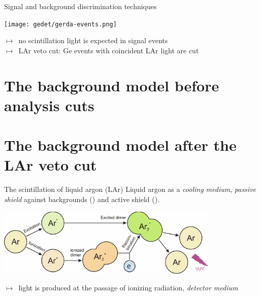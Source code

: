 \documentclass[10pt,aspectratio=169]{beamer}
\newcommand{\arrow}{$\longmapsto$}
\begin{document}
\begin{frame}{Signal and background discrimination techniques}
  \begin{center}
    \texttt{[image: gedet/gerda-events.png]}
  \end{center}
  \arrow\ no scintillation light is expected in signal events \\
  \arrow\ \alert{LAr veto cut:} Ge events with coincident LAr light are cut
\end{frame}
\section{The background model before analysis cuts}
\section{The background model after the LAr veto cut}
\begin{frame}{The scintillation of liquid argon (LAr)}
  Liquid argon as a \emph{cooling medium}, \emph{passive shield} against
  backgrounds (\phaseone) and \alert{active shield} (\phasetwo).
  \begin{center}
    \includegraphics[width=0.8\textwidth]{lar-scint-mechanism.pdf}
  \end{center}
  \arrow\ light is produced at the passage of ionizing radiation,
  \emph{detector medium}
\end{frame}
\end{document}
